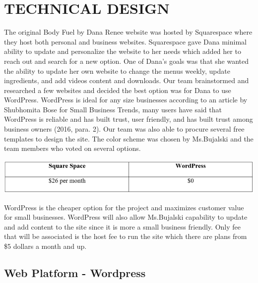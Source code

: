 \documentclass[letterpaper,11pt,2p]{elsarticle}
\begin{document}
\newpage 

\section{ TECHNICAL DESIGN}%
\label{TD}%

The original Body Fuel by Dana Renee website was hosted by Squarespace where they host both personal and business websites. Squarespace gave Dana minimal ability to update and personalize the website to her needs which added her to reach out and search for a new option.  One of Dana’s goals was that she wanted the ability to update her own website to change the menus weekly, update ingredients, and add videos content and downloads.  Our team brainstormed and researched a few websites and decided the best option was for Dana to use WordPress. WordPress is ideal for any size businesses according to an article by Shubhomita Bose for Small Business Trends, many users have said that WordPress is reliable and has built trust, user friendly, and has built trust among business owners (2016, para. 2). Our team was also able to procure several free templates to design the site. The color scheme was chosen by Ms.Bujalski and the team members who voted on several options. \\

\begin{center}
\includegraphics[scale=0.7]{Platform}\\
\end{center}

WordPress is the cheaper option for the project and maximizes customer value for small businesses. WordPress will also allow Ms.Bujalski capability to update and add content to the site since it is more a small business friendly. Only fee that will be associated is the host fee to run the site which there are plans from \$5 dollars a month and up.\\

\subsection{Web Platform - Wordpress}
\label{subsec1}
\end{document}
